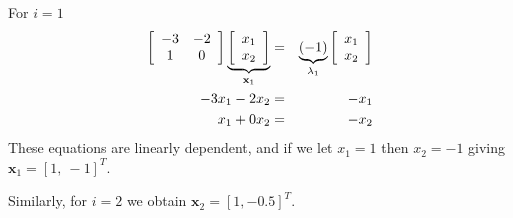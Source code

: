 For $i=1$
\begin{eqnarray*}
 \left[ {\begin{array}{*{20}c}
   { - 3} & { - 2}  \\
   1 & 0  \\
\end{array}} \right]\underbrace {\left[ {\begin{array}{*{20}c}
   {x_1 }  \\
   {x_2 }  \\
\end{array}} \right]}_{{\bf{x}}_1 } & = & \underbrace {( - 1)}_{\lambda _1 }\left[ {\begin{array}{*{20}c}
   {x_1 }  \\
   {x_2 }  \\
\end{array}} \right] \\
  - 3x_1  - 2x_2  & = &  - x_1  \\
 x_1  + 0x_2  & = &  - x_2  \\
 \end{eqnarray*}
These equations are linearly dependent, and if we let $x_1 =1$ then $x_2 = -1$ giving $\mathbf{x}_1=[1,\ -1]^T$.

Similarly, for $i=2$ we obtain $\mathbf{x}_2=[1, -0.5]^T$.

